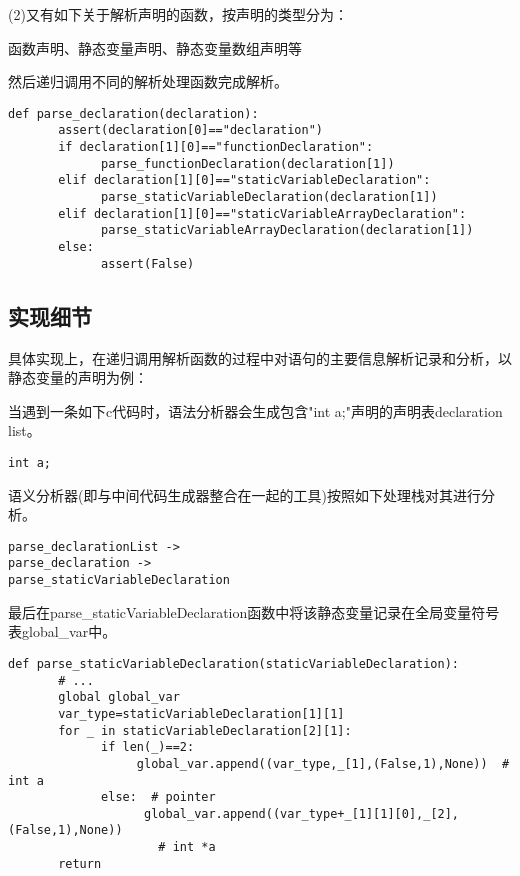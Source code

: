 \documentclass{article}
\begin{document}
(2)又有如下关于解析声明的函数，按声明的类型分为：

函数声明、静态变量声明、静态变量数组声明等

然后递归调用不同的解析处理函数完成解析。

\begin{verbatim}
def parse_declaration(declaration):
       assert(declaration[0]=="declaration")
       if declaration[1][0]=="functionDeclaration":
             parse_functionDeclaration(declaration[1])
       elif declaration[1][0]=="staticVariableDeclaration":
             parse_staticVariableDeclaration(declaration[1])
       elif declaration[1][0]=="staticVariableArrayDeclaration":
             parse_staticVariableArrayDeclaration(declaration[1])
       else:
             assert(False)
\end{verbatim}

\subsection{实现细节}

具体实现上，在递归调用解析函数的过程中对语句的主要信息解析记录和分析，以静态变量的声明为例：

当遇到一条如下c代码时，语法分析器会生成包含"int a;"声明的声明表declaration list。

\begin{verbatim}
int a;
\end{verbatim}

语义分析器(即与中间代码生成器整合在一起的工具)按照如下处理栈对其进行分析。

\begin{verbatim}
parse_declarationList ->
parse_declaration ->
parse_staticVariableDeclaration
\end{verbatim}

最后在parse\_staticVariableDeclaration函数中将该静态变量记录在全局变量符号表global\_var中。

\begin{verbatim}
def parse_staticVariableDeclaration(staticVariableDeclaration):
       # ...
       global global_var
       var_type=staticVariableDeclaration[1][1]
       for _ in staticVariableDeclaration[2][1]:
             if len(_)==2:
                  global_var.append((var_type,_[1],(False,1),None))  # int a
             else:  # pointer
                   global_var.append((var_type+_[1][1][0],_[2],(False,1),None))
                     # int *a
       return
\end{verbatim}
\end{document}
